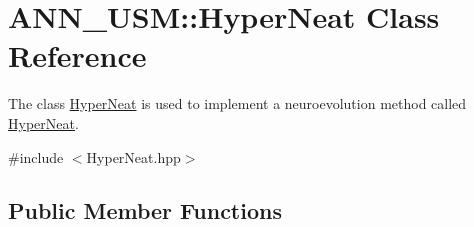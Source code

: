\hypertarget{class_a_n_n___u_s_m_1_1_hyper_neat}{\section{A\-N\-N\-\_\-\-U\-S\-M\-:\-:Hyper\-Neat Class Reference}
\label{class_a_n_n___u_s_m_1_1_hyper_neat}
}


The class \hyperlink{class_a_n_n___u_s_m_1_1_hyper_neat}{Hyper\-Neat} is used to implement a neuroevolution method called \hyperlink{class_a_n_n___u_s_m_1_1_hyper_neat}{Hyper\-Neat}.  




{\ttfamily \#include $<$Hyper\-Neat.\-hpp$>$}

\subsection*{Public Member Functions}
